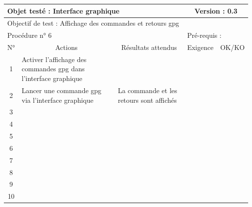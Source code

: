 \documentclass{../res/univ-projet}
\begin{document}
\begin{center}
    \begin{tabular}{|c|p{5cm}|p{5cm}|p{1.5cm}|p{1.5cm}|}
      \hline
      \multicolumn{3}{|l|}{Objet testé : Interface graphique} & \multicolumn{2}{c|}{Version : 0.3}\\ \hline
      \multicolumn{5}{|l|}{Objectif de test : Affichage des commandes et retours gpg}\\ \hline
      \multicolumn{3}{|l|}{Procédure n° 6} & \multicolumn{2}{p{3cm}|}{Pré-requis : }\\ \hline
      \multicolumn{1}{|c|}{N°} & \multicolumn{1}{c|}{Actions} & \multicolumn{1}{c|}{Résultats attendus} & 
      \multicolumn{1}{c|}{Exigence} & \multicolumn{1}{c|}{OK/KO}\\ \hline
      1 & Activer l'affichage des commandes gpg dans l'interface graphique &  &  & \\
      2 & Lancer une commande gpg via l'interface graphique & La commande et les retours sont affichés &  & \\
      3 &  &  &  & \\ 
	  4 &  &  &  & \\
      5 &  &  &  & \\
	  6 &  &  &  & \\
      7 &  &  &  & \\
      8 &  &  &  & \\
      9 &  &  &  & \\
      10 &  &  &  &\\ 
	\hline
    \end{tabular}
    \vskip 2.2cm




\end{center}
\end{document}

